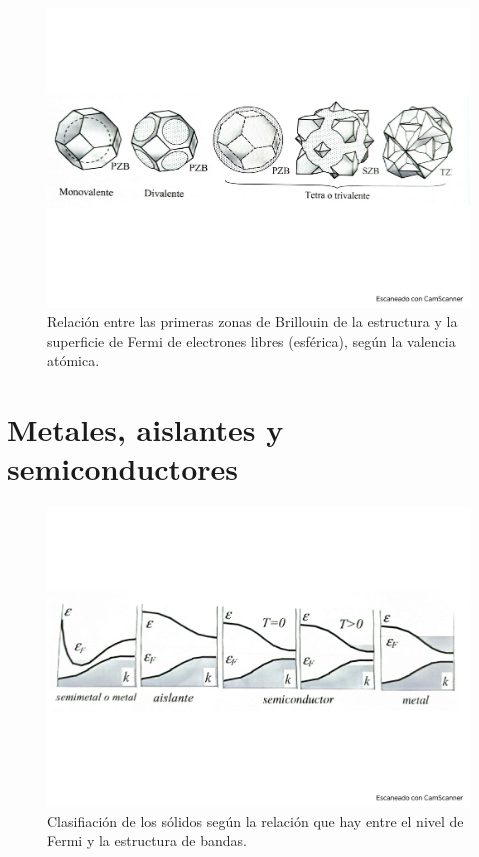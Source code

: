 \begin{figure}[h!] \centering
    \includegraphics[scale=0.5]{Cuerpo/Ch_07/Fotos libro 9.pdf}
    \caption{Relación entre las primeras zonas de Brillouin de la estructura \fcc y la superficie de Fermi de electrones libres (esférica), según la valencia atómica.}
    \label{Fig:07-09}
\end{figure}    


\section{Metales, aislantes y semiconductores}
\begin{figure}[h!] \centering
    \includegraphics[scale=0.5]{Cuerpo/Ch_07/Fotos libro 10.pdf}
    \caption{Clasifiación de los sólidos según la relación que hay entre el nivel de Fermi y la estructura de bandas.}
    \label{Fig:07-10}
\end{figure}    
